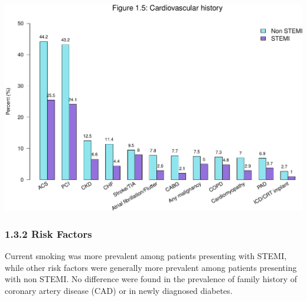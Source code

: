 \documentclass[
]{article}
\begin{document}
\includegraphics{ACSIS_2024_v1_pdf_files/figure-latex/unnamed-chunk-19-1.pdf}

\pagebreak

\subsubsection{1.3.2 Risk Factors}\label{risk-factors}

Current smoking was more prevalent among patients presenting with STEMI,
while other risk factors were generally more prevalent among patients
presenting with non STEMI. No difference were found in the prevalence of
family history of coronary artery disease (CAD) or in newly diagnosed
diabetes.

~
\end{document}
